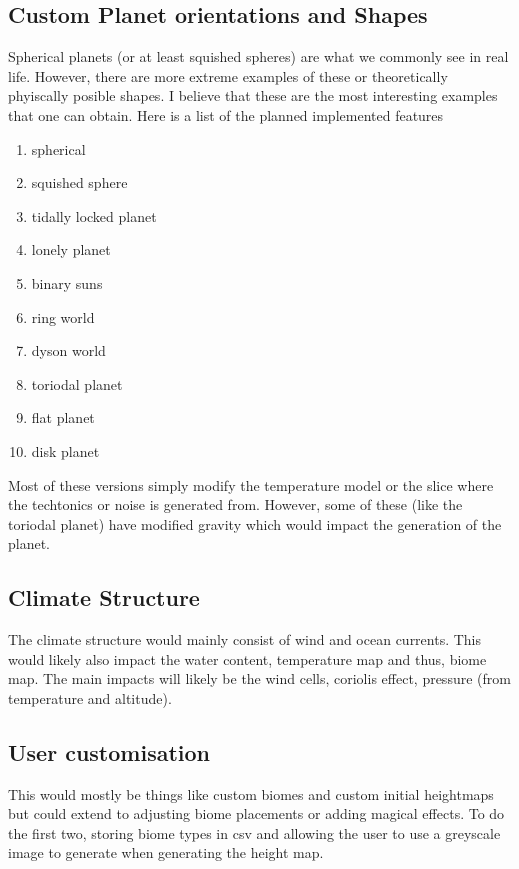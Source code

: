 \documentclass[11pt]{article}
\begin{document}
    \subsection{Custom Planet orientations and Shapes}\label{subsec:custom-planet-orientations-and-shapes}
    Spherical planets (or at least squished spheres) are what we commonly see in real life.
    However, there are more extreme examples of these or theoretically phyiscally posible shapes.
    I believe that these are the most interesting examples that one can obtain.
    Here is a list of the planned implemented features
    \begin{enumerate}
        \item spherical
        \item squished sphere
        \item tidally locked planet
        \item lonely planet
        \item binary suns
        \item ring world
        \item dyson world
        \item toriodal planet
        \item flat planet
        \item disk planet
    \end{enumerate}
    Most of these versions simply modify the temperature model or the slice where the techtonics or noise is generated from.
    However, some of these (like the toriodal planet) have modified gravity which would impact the generation of the planet.
    \subsection{Climate Structure}\label{subsec:climate-structure}
    The climate structure would mainly consist of wind and ocean currents.
    This would likely also impact the water content, temperature map and thus, biome map.
    The main impacts will likely be the wind cells, coriolis effect, pressure (from temperature and altitude).
    \subsection{User customisation}\label{subsec:user-customisation}
    This would mostly be things like custom biomes and custom initial heightmaps but could extend to adjusting biome placements or adding magical effects.
    To do the first two, storing biome types in csv and allowing the user to use a greyscale image to generate when generating the height map.
\end{document}
